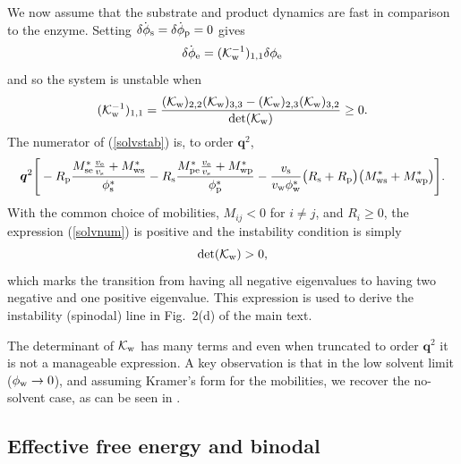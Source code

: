 We now assume that the substrate and product dynamics are fast in comparison to the enzyme. Setting $\dot{\delta\phi_{\mathrm{s}}}=\dot{\delta\phi_{\mathrm{p}}}=0$ gives
\begin{equation}
    \dot{\delta\phi_{\mathrm{e}}} = ({\cal K}_{\rm w}^{-1})_{1, 1}\delta\phi_{\mathrm{e}}
\end{equation}
and so the system is unstable when
\begin{equation}
    ({\cal K}_{\rm w}^{-1})_{1, 1} = \frac{({\cal K}_{\rm w})_{2, 2}({\cal K}_{\rm w})_{3, 3}-({\cal K}_{\rm w})_{2, 3}({\cal K}_{\rm w})_{3, 2}}{\det({\cal K}_{\rm w})} \geq 0.
    \label{solvstab}
\end{equation}
The numerator of (\ref{solvstab}) is, to order $\bm{q}^2$,
\begin{equation}
    \bm{q}^2\Bigg[-R_\mathrm{p} \frac{M_{\mathrm{se}}^*\frac{v_{\mathrm{e}}}{v_{\mathrm{s}}}+M_{\mathrm{ws}}^*}{\phi_{\mathrm{s}}^*}-R_\mathrm{s} \frac{M_{\mathrm{pe}}^*\frac{v_{\mathrm{e}}}{v_{\mathrm{s}}}+M_{\mathrm{wp}}^*}{\phi_{\mathrm{p}}^*}-\frac{v_{\mathrm{s}}}{v_{\mathrm{w}}\phi_{\mathrm{w}}^*}\big(R_\mathrm{s} +R_\mathrm{p} \big)\big(M_{\mathrm{ws}}^*+M_{\mathrm{wp}}^*\big)\Bigg].
    \label{solvnum}
\end{equation}
With the common choice of mobilities, $M_{ij}<0$ for $i \neq j$, and $R_i \geq 0$, the expression (\ref{solvnum}) is positive and the instability condition is simply
\begin{equation}
    \det({\cal K}_{\rm w}) > 0,
\end{equation}
which marks the transition from having all negative eigenvalues to having two negative and one positive eigenvalue. This expression is used to derive the instability (spinodal) line in Fig.~2(d) of the main text.

The determinant of ${\cal{K}}_{\rm w}$ has many terms and even when truncated to order $\bm{q}^2$ it is not a manageable expression. A key observation is that in the low solvent limit ($\phi_{\mathrm{w}} \to 0$), and assuming Kramer's form for the mobilities, we recover the no-solvent case, as can be seen in .

\subsection{Effective free energy and binodal}

